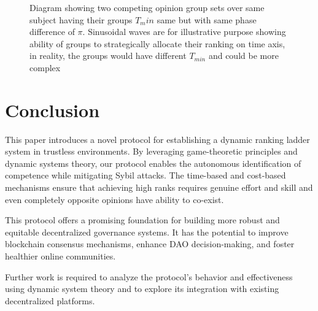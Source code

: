 \documentclass{article}
\begin{document}
\begin{CJK}{UTF8}{gbsn}
\begin{figure}[ht]
\begin{tikzpicture}
        \end{tikzpicture}
        \caption{Diagram showing two competing opinion group sets over same subject having their groups $T_min$ same but with same phase difference of $\pi$. Sinusoidal waves are for illustrative purpose showing ability of groups to strategically allocate their ranking on time axis, in reality, the groups would have different $T_{min}$ and could be more complex
            \label{fig:processes-sinusoidal}}
    \end{figure}

    \section{Conclusion}

    This paper introduces a novel protocol for establishing a dynamic ranking ladder system in trustless environments. By leveraging game-theoretic principles and dynamic systems theory, our protocol enables the autonomous identification of competence while mitigating Sybil attacks. The time-based and cost-based mechanisms ensure that achieving high ranks requires genuine effort and skill and even completely opposite opinions have ability to co-exist.

    This protocol offers a promising foundation for building more robust and equitable decentralized governance systems. It has the potential to improve blockchain consensus mechanisms, enhance DAO decision-making, and foster healthier online communities.

    Further work is required to analyze the protocol's behavior and effectiveness using dynamic system theory and to explore its integration with existing decentralized platforms.






    \clearpage

    
    

    \clearpage\end{CJK}
\end{document}
